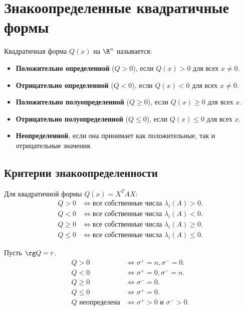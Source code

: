 \documentclass[12pt]{article}
\begin{document}
\section{Знакоопределенные квадратичные формы}

\begin{definition}
Квадратичная форма $Q(x)$ на $\R^n$ называется:
\begin{itemize}
    \item \textbf{Положительно определенной} ($Q > 0$), если $Q(x) > 0$ для всех $x \neq 0$.
    \item \textbf{Отрицательно определенной} ($Q < 0$), если $Q(x) < 0$ для всех $x \neq 0$.
    \item \textbf{Положительно полуопределенной} ($Q \ge 0$), если $Q(x) \ge 0$ для всех $x$.
    \item \textbf{Отрицательно полуопределенной} ($Q \le 0$), если $Q(x) \le 0$ для всех $x$.
    \item \textbf{Неопределенной}, если она принимает как положительные, так и отрицательные значения.
\end{itemize}
\end{definition}

\subsection{Критерии знакоопределенности}

\begin{theorem}
Для квадратичной формы $Q(x) = X^T A X$:
\begin{align*}
Q > 0 &\iff \text{все собственные числа } \lambda_i(A) > 0. \\
Q < 0 &\iff \text{все собственные числа } \lambda_i(A) < 0. \\
Q \ge 0 &\iff \text{все собственные числа } \lambda_i(A) \ge 0. \\
Q \le 0 &\iff \text{все собственные числа } \lambda_i(A) \le 0.
\end{align*}
\end{theorem}

\begin{theorem}
Пусть $\rg Q = r$.
\begin{align*}
Q > 0 &\iff \sigma^+ = n, \sigma^- = 0. \\
Q < 0 &\iff \sigma^+ = 0, \sigma^- = n. \\
Q \ge 0 &\iff \sigma^- = 0. \\
Q \le 0 &\iff \sigma^+ = 0. \\
Q \text{ неопределена} &\iff \sigma^+ > 0 \text{ и } \sigma^- > 0.
\end{align*}
\end{theorem}
\end{document}
